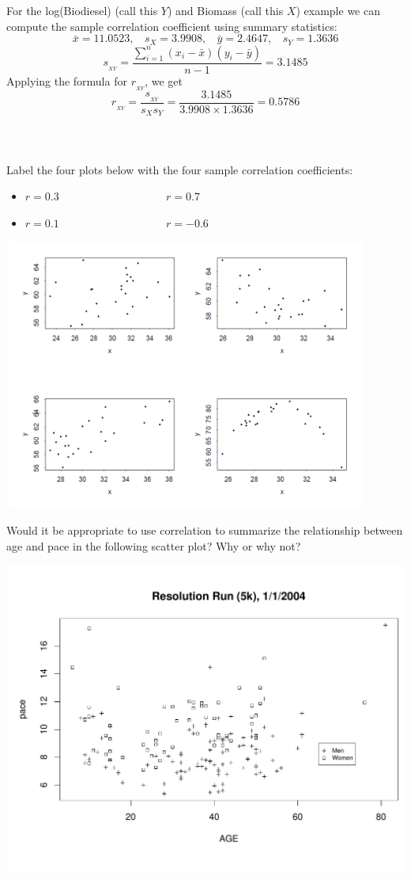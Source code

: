 For the log(Biodiesel) (call this $Y$) and Biomass (call this $X$) example we can compute the sample correlation coefficient using summary statistics: \label{bio}
$$ \bar{x}=11.0523, ~~~~ s_X=3.9908, ~~~~\bar{y}=2.4647, ~~~~ s_Y = 1.3636$$ 
$$ s_{_{XY}}=\frac{\sum_{i=1}^{n}(x_i-\bar{x})(y_i-\bar{y})}{n-1} = 3.1485$$
Applying the formula for $r_{_{XY}}$, we get
$$ r_{_{XY}}=\frac{s_{_{XY}}}{s_X s_Y}=\frac{3.1485}{3.9908 \times 1.3636} =0.5786$$~\\~\\~\\

Label the four plots below with the four sample correlation coefficients:
\begin{itemize}
\item $r=0.3$ ~~~~~~~~~~~~~~~~~~ $r=0.7$ 
\item $r=0.1$ ~~~~~~~~~~~~~~~~~~ $r=-0.6$ 
\end{itemize}
\begin{center}
\includegraphics[height=3.5in,width=4.75in]{scattermatch}
\end{center}

\newpage

Would it be appropriate to use correlation to summarize the relationship between age and pace in the following scatter plot?  Why or why not?
\begin{center}
\includegraphics[scale=0.3]{res5k_nomodel.pdf}
\end{center}



